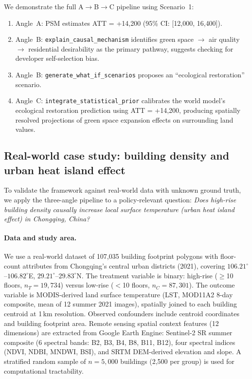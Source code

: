 \documentclass{article}
\begin{document}
We demonstrate the full A$\to$B$\to$C pipeline using Scenario~1:
\begin{enumerate}
\item Angle~A: PSM estimates ATT = +14{,}200 (95\% CI: [12{,}000, 16{,}400]).
\item Angle~B: \texttt{explain\_causal\_mechanism} identifies green space $\to$ air quality $\to$ residential desirability as the primary pathway, suggests checking for developer self-selection bias.
\item Angle~B: \texttt{generate\_what\_if\_scenarios} proposes an ``ecological restoration'' scenario.
\item Angle~C: \texttt{integrate\_statistical\_prior} calibrates the world model's ecological restoration prediction using ATT = +14{,}200, producing spatially resolved projections of green space expansion effects on surrounding land values.
\end{enumerate}

\subsection{Real-world case study: building density and urban heat island effect}
\label{sec:realworld}

To validate the framework against real-world data with unknown ground truth, we apply the three-angle pipeline to a policy-relevant question: \textit{Does high-rise building density causally increase local surface temperature (urban heat island effect) in Chongqing, China?}

\paragraph{Data and study area.} We use a real-world dataset of 107,035 building footprint polygons with floor-count attributes from Chongqing's central urban districts (2021), covering $106.21^\circ$--$106.82^\circ$E, $29.21^\circ$--$29.83^\circ$N. The treatment variable is binary: high-rise ($\geq$10 floors, $n_T = 19{,}734$) versus low-rise ($<$10 floors, $n_C = 87{,}301$). The outcome variable is MODIS-derived land surface temperature (LST, MOD11A2 8-day composite, mean of 12 summer 2021 images), spatially joined to each building centroid at 1\,km resolution. Observed confounders include centroid coordinates and building footprint area. Remote sensing spatial context features (12 dimensions) are extracted from Google Earth Engine: Sentinel-2 SR summer composite (6 spectral bands: B2, B3, B4, B8, B11, B12), four spectral indices (NDVI, NDBI, MNDWI, BSI), and SRTM DEM-derived elevation and slope. A stratified random sample of $n = 5{,}000$ buildings (2,500 per group) is used for computational tractability.
\end{document}
